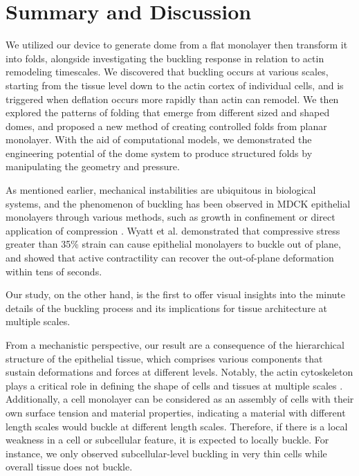 \newpage
\hypertarget{summary-and-discussion-1}{%
	\section{Summary and Discussion}\label{summary-and-discussion-1}}

We utilized our device to generate dome from a flat monolayer then transform it into folds, alongside investigating the buckling response in relation to actin remodeling timescales. We discovered that buckling occurs at various scales, starting from the tissue level down to the actin cortex of individual cells, and is triggered when deflation occurs more rapidly than actin can remodel. We then explored the patterns of folding that emerge from different sized and shaped domes, and proposed a new method of creating controlled folds from planar monolayer. With the aid of computational models, we demonstrated the engineering potential of the dome system to produce structured folds by manipulating the geometry and pressure.

As mentioned earlier, mechanical instabilities are ubiquitous in biological systems, and the phenomenon of buckling has been observed in MDCK epithelial monolayers through various methods, such as growth in confinement or direct application of compression \cite{wyatt2020,trushko2020}. Wyatt et al. demonstrated that compressive stress greater than 35\% strain can cause epithelial monolayers to buckle out of plane, and showed that active contractility can recover the out-of-plane deformation within tens of seconds.

Our study, on the other hand, is the first to offer visual insights into the minute details of the buckling process and its implications for tissue architecture at multiple scales.

From a mechanistic perspective, our result are a consequence of the hierarchical structure of the epithelial tissue, which comprises various components that sustain deformations and forces at different levels. Notably, the actin cytoskeleton plays a critical role in defining the shape of cells and tissues at multiple scales \cite{clarke2021}. Additionally, a cell monolayer can be considered as an assembly of cells with their own surface tension and material properties, indicating a material with different length scales would buckle at different length scales. Therefore, if there is a local weakness in a cell or subcellular feature, it is expected to locally buckle. For instance, we only observed subcellular-level buckling in very thin cells while overall tissue does not buckle.

